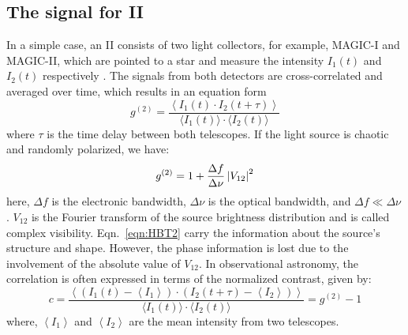 \subsection{The signal for II}\label{sec:signal}
In a simple case, an II consists of two light collectors, for example, MAGIC-I and MAGIC-II, which are pointed to a star and measure the intensity $I_1(t)$ and $I_2(t)$ respectively \citep{acciari2020optical, dravins2013optical}. The signals from both detectors are cross-correlated and averaged over time, which results in an equation form
\begin{equation}
	g^{(2)} = \frac{\left\langle I_1(t) \cdot I_2(t + \tau) \right\rangle}{\langle I_1(t) \rangle \cdot \langle I_2(t) \rangle} 
	\label{eqn:HBT}
\end{equation}
where $\tau$ is the time delay between both telescopes. If the light source is chaotic and randomly polarized, we have:
\begin{equation}
	g^{(2)} = 1 + \frac{\Delta f}{\Delta \nu} \left|V_{12}\right|^2
	\label{eqn:HBT2}
\end{equation}
here, $\Delta f$ is the electronic bandwidth, $\Delta \nu$ is the optical bandwidth, and $\Delta f \ll \Delta \nu$ \citep{acciari2020optical}. $V_{12}$ is the Fourier transform of the source brightness distribution and is called complex visibility. Eqn.~\ref{eqn:HBT2} carry the information about the source's structure and shape. However, the phase information is lost due to the involvement of the absolute value of $V_{12}$. In observational astronomy, the correlation is often expressed in terms of the normalized contrast, given by:
\begin{equation}
	c = \frac{\left\langle \left( I_1(t) - \left\langle I_1 \right\rangle \right) \cdot \left( I_2(t + \tau) - \left\langle I_2 \right\rangle \right) \right\rangle}{\langle I_1(t) \rangle \cdot \langle I_2(t) \rangle} = g^{(2)} - 1
\end{equation}
where, $\left\langle I_1 \right\rangle$ and $\left\langle I_2 \right\rangle$ are the mean intensity from two telescopes.

